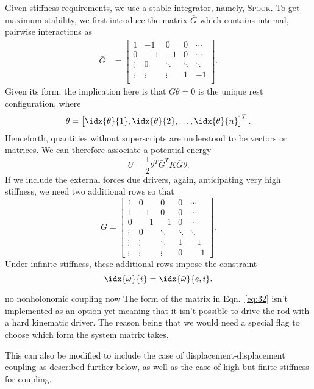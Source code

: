 \documentclass[10pt,notitlepage,abstracton]{scrartcl}
\theoremstyle{plain}
\theoremstyle{plain}
\theoremstyle{plain}
\begin{document}
Given stiffness requirements, we use a stable
integrator, namely, \textsc{Spook}.  To get maximum stability, we first
introduce the matrix  $\bar{G}$ which contains internal, pairwise
interactions as 
\begin{equation}
  \label{eq:15}
  \begin{split}
    \bar{G} & =
    \begin{bmatrix}
      1 &  -1  & 0 & 0 &  \cdots \\
      0 &   \phantom{-}1  & -1 & 0 &  \cdots \\
      \vdots &   0  &  \ddots & \ddots &  \ddots \\
      \vdots &   \vdots  &  \vdots &   1 & -1  \\
    \end{bmatrix}. 
  \end{split}
\end{equation}
Given its form, the implication here is that $G\theta = 0$ is the unique
rest configuration, where
\begin{equation}
  \label{eq:6}
  \theta =
  \begin{bmatrix}
    \idx{\theta}{1},\idx{\theta}{2}, \ldots, \idx{\theta}{n}
  \end{bmatrix}^{T}. 
\end{equation}
Henceforth, quantities without superscripts are understood to be vectors or
matrices.  We can therefore associate a potential energy
\begin{equation}
  \label{eq:4}
  U  = \frac{1}{2}\theta^{T} \bar{G}^{T}K\bar{G}\theta. 
\end{equation}
If we include the external forces due drivers, again, anticipating
very high stiffness, we need two additional rows so that
\begin{equation}
  \label{eq:32}
    G = \begin{bmatrix}
      1 &  0  & 0 & 0 &  \cdots \\
      1 &  -1  & 0 & 0 &  \cdots \\
      0 &   \phantom{-}1  & -1 & 0 &  \cdots \\
      \vdots &   0  &  \ddots & \ddots &  \ddots \\
      \vdots &   \vdots  &  \ddots &   1 & -1  \\
      \vdots &   \vdots  &  \vdots &   0 & \phantom{-}1
    \end{bmatrix}. 
\end{equation}
Under infinite stiffness, these additional rows impose the constraint
\begin{equation}
  \label{eq:5}
\idx{\omega}{i} = \idx{\bar{\omega}}{e,i}. 
\end{equation}
\begin{anfxnote}{no nonholonomic coupling now}
  The form of the matrix in Eqn.~\eqref{eq:32} isn't implemented as an
  option yet meaning that it isn't possible to drive the rod with a hard
  kinematic driver.  The reason being that we would need a special flag to
  choose which form the system matrix takes.  
\end{anfxnote}
This can also be modified to include the case of displacement-displacement
coupling as described further below, as well as the case of high but finite
stiffness for coupling. 
\end{document}

